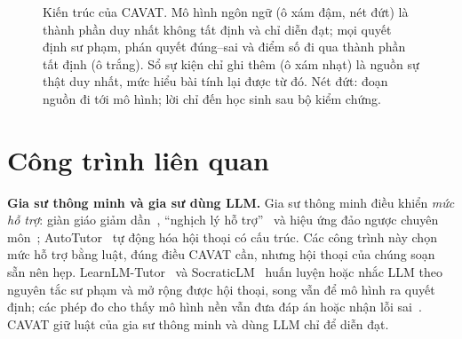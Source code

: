 \documentclass[10pt,a4paper,twocolumn]{article}
\begin{document}
\begin{figure}[t]
\caption{Kiến trúc của CAVAT. Mô hình ngôn ngữ (ô xám đậm, nét đứt) là thành phần duy nhất không tất định và chỉ diễn đạt; mọi quyết định sư phạm, phán quyết đúng--sai và điểm số đi qua thành phần tất định (ô trắng). Sổ sự kiện chỉ ghi thêm (ô xám nhạt) là nguồn sự thật duy nhất, mức hiểu bài tính lại được từ đó. Nét đứt: đoạn nguồn đi tới mô hình; lời chỉ đến học sinh sau bộ kiểm chứng.}
\label{fig:arch}
\end{figure}

\section{Công trình liên quan}\label{sec:related}
\textbf{Gia sư thông minh và gia sư dùng LLM.} Gia sư thông minh điều khiển \emph{mức hỗ trợ}: giàn giáo giảm dần~\cite{wood1976}, ``nghịch lý hỗ trợ''~\cite{koedinger2007,aleven2016} và hiệu ứng đảo ngược chuyên môn~\cite{kalyuga2003}; AutoTutor~\cite{graesser2005} tự động hóa hội thoại có cấu trúc. Các công trình này chọn mức hỗ trợ bằng luật, đúng điều CAVAT cần, nhưng hội thoại của chúng soạn sẵn nên hẹp. LearnLM-Tutor~\cite{jurenka2024} và SocraticLM~\cite{liu2024socratic} huấn luyện hoặc nhắc LLM theo nguyên tắc sư phạm và mở rộng được hội thoại, song vẫn để mô hình ra quyết định; các phép đo cho thấy mô hình nền vẫn đưa đáp án hoặc nhận lỗi sai~\cite{macina2023,tack2022}. CAVAT giữ luật của gia sư thông minh và dùng LLM chỉ để diễn đạt.
\end{document}

